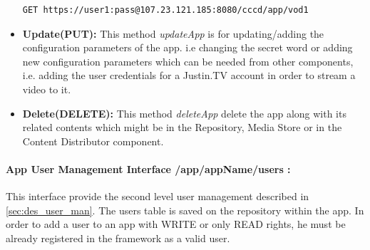 \begin{itemize}
\begin{code}
\begin{verbatim}
GET https://user1:pass@107.23.121.185:8080/cccd/app/vod1
\end{verbatim}
\end{code}

\item \textbf{Update(PUT):}  This method \textit{updateApp} is for updating/adding the configuration parameters of the app. i.e changing the secret word or adding new configuration parameters which can be needed from other components, i.e. adding the user credentials for a Justin.TV account in order to stream a video to it.

\item \textbf{Delete(DELETE):} This method \textit{deleteApp} delete the app along with its related contents which might be in the Repository, Media Store or in the Content Distributor component.

\end{itemize}

\paragraph{App User Management Interface /app/{appName}/users :} This interface provide the second level user management described in \ref{sec:des_user_man}. The users table is saved on the repository within the app. In order to add a user to an app with WRITE or only READ rights, he must be already registered in the framework as a valid user.

